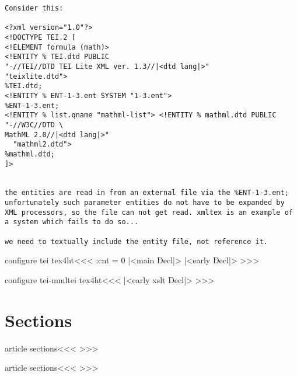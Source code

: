 {\begin{verbatim}
Consider this:

<?xml version="1.0"?>
<!DOCTYPE TEI.2 [
<!ELEMENT formula (math)>
<!ENTITY % TEI.dtd PUBLIC
"-//TEI//DTD TEI Lite XML ver. 1.3//|<dtd lang|>"
"teixlite.dtd">
%TEI.dtd;
<!ENTITY % ENT-1-3.ent SYSTEM "1-3.ent">
%ENT-1-3.ent;
<!ENTITY % list.qname "mathml-list"> <!ENTITY % mathml.dtd PUBLIC "-//W3C//DTD \
MathML 2.0//|<dtd lang|>"
  "mathml2.dtd">
%mathml.dtd;
]>


the entities are read in from an external file via the %ENT-1-3.ent;
unfortunately such parameter entities do not have to be expanded by
XML processors, so the file can not get read. xmltex is an example of
a system which fails to do so...

we need to textually include the entity file, not reference it.
\end{verbatim}


\<configure tei tex4ht\><<<
\HAssign\ent:cnt = 0
   {}
   {{\ifdim \lastskip>\z@ \unskip\fi
     \IgnorePar\parindent\z@ \leavevmode}%
     |<main Decl|>%
   } 
|<early Decl|>
>>>


\<configure tei-mmltei tex4ht\><<<
   {}
   {{\ifdim \lastskip>\z@ \unskip\fi
     \IgnorePar\parindent\z@ \leavevmode}%
   } 
|<early xslt Decl|>
>>>


\section{Sections}

\<article sections\><<<
   {}   {}
   {} {\CloseHead}
   {}   {}
   {}   {\CloseHead}
   {}   {}
   {}   {\CloseHead}
   {}   {}
   {}   {\CloseHead}
   {}   {}
   {}   {\CloseHead}
   {}   {}
   {}   {\CloseHead}
>>>




\<article sections\><<<
   {}   {}
   {} {\CloseHead}
   {}   {}
   {}   {\CloseHead}
   {}   {}
   {}   {\CloseHead}
   {}   {}
   {}   {\CloseHead}
   {}   {}
   {}   {\CloseHead}
   {}   {}
   {}   {\CloseHead}
>>>



}
